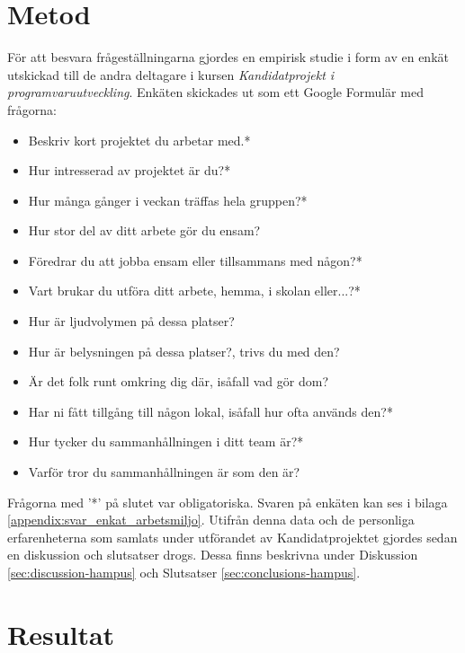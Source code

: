 \section{Metod}
\label{sec:method-hampus}

För att besvara frågeställningarna gjordes en empirisk studie i form av en enkät utskickad till de andra deltagare i kursen \textit{Kandidatprojekt i programvaruutveckling}. Enkäten skickades ut som ett Google Formulär \cite{GForms} med frågorna:
\begin{itemize}
\item Beskriv kort projektet du arbetar med.*
\item Hur intresserad av projektet är du?*
\item Hur många gånger i veckan träffas hela gruppen?*
\item Hur stor del av ditt arbete gör du ensam?
\item Föredrar du att jobba ensam eller tillsammans med någon?*
\item Vart brukar du utföra ditt arbete, hemma, i skolan eller...?*
\item Hur är ljudvolymen på dessa platser?
\item Hur är belysningen på dessa platser?, trivs du med den?
\item Är det folk runt omkring dig där, isåfall vad gör dom?
\item Har ni fått tillgång till någon lokal, isåfall hur ofta används den?*
\item Hur tycker du sammanhållningen i ditt team är?*
\item Varför tror du sammanhållningen är som den är?
\end{itemize}
Frågorna med '*' på slutet var obligatoriska. Svaren på enkäten kan ses i bilaga \ref{appendix:svar_enkat_arbetsmiljo}. Utifrån denna data och de personliga erfarenheterna som samlats under utförandet av Kandidatprojektet gjordes sedan en diskussion och slutsatser drogs. Dessa finns beskrivna under Diskussion \ref{sec:discussion-hampus} och Slutsatser \ref{sec:conclusions-hampus}. 

\section{Resultat}
\label{sec:results-hampus}

